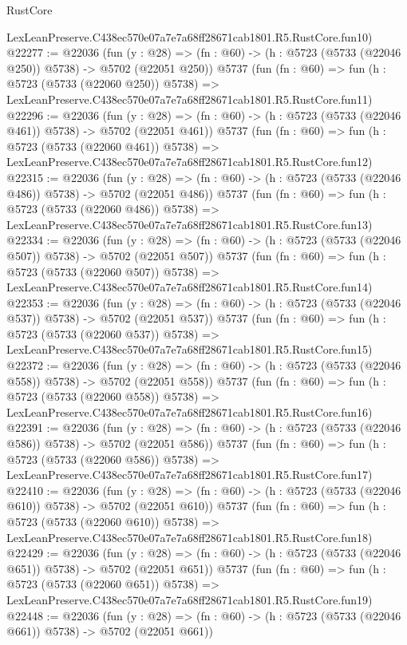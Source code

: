 \begin{lexlean}{RustCore}
\begin{coremodule}
    LexLeanPreserve.C438ec570e07a7e7a68ff28671cab1801.R5.RustCore.fun10)
@22277 := @22036
    (fun (y : @28) => (fn : @60) -> (h : @5723 (@5733 (@22046 @250)) @5738) -> @5702 (@22051 @250))
    @5737
    (fun (fn : @60) =>
    fun (h : @5723 (@5733 (@22060 @250)) @5738) =>
    LexLeanPreserve.C438ec570e07a7e7a68ff28671cab1801.R5.RustCore.fun11)
@22296 := @22036
    (fun (y : @28) => (fn : @60) -> (h : @5723 (@5733 (@22046 @461)) @5738) -> @5702 (@22051 @461))
    @5737
    (fun (fn : @60) =>
    fun (h : @5723 (@5733 (@22060 @461)) @5738) =>
    LexLeanPreserve.C438ec570e07a7e7a68ff28671cab1801.R5.RustCore.fun12)
@22315 := @22036
    (fun (y : @28) => (fn : @60) -> (h : @5723 (@5733 (@22046 @486)) @5738) -> @5702 (@22051 @486))
    @5737
    (fun (fn : @60) =>
    fun (h : @5723 (@5733 (@22060 @486)) @5738) =>
    LexLeanPreserve.C438ec570e07a7e7a68ff28671cab1801.R5.RustCore.fun13)
@22334 := @22036
    (fun (y : @28) => (fn : @60) -> (h : @5723 (@5733 (@22046 @507)) @5738) -> @5702 (@22051 @507))
    @5737
    (fun (fn : @60) =>
    fun (h : @5723 (@5733 (@22060 @507)) @5738) =>
    LexLeanPreserve.C438ec570e07a7e7a68ff28671cab1801.R5.RustCore.fun14)
@22353 := @22036
    (fun (y : @28) => (fn : @60) -> (h : @5723 (@5733 (@22046 @537)) @5738) -> @5702 (@22051 @537))
    @5737
    (fun (fn : @60) =>
    fun (h : @5723 (@5733 (@22060 @537)) @5738) =>
    LexLeanPreserve.C438ec570e07a7e7a68ff28671cab1801.R5.RustCore.fun15)
@22372 := @22036
    (fun (y : @28) => (fn : @60) -> (h : @5723 (@5733 (@22046 @558)) @5738) -> @5702 (@22051 @558))
    @5737
    (fun (fn : @60) =>
    fun (h : @5723 (@5733 (@22060 @558)) @5738) =>
    LexLeanPreserve.C438ec570e07a7e7a68ff28671cab1801.R5.RustCore.fun16)
@22391 := @22036
    (fun (y : @28) => (fn : @60) -> (h : @5723 (@5733 (@22046 @586)) @5738) -> @5702 (@22051 @586))
    @5737
    (fun (fn : @60) =>
    fun (h : @5723 (@5733 (@22060 @586)) @5738) =>
    LexLeanPreserve.C438ec570e07a7e7a68ff28671cab1801.R5.RustCore.fun17)
@22410 := @22036
    (fun (y : @28) => (fn : @60) -> (h : @5723 (@5733 (@22046 @610)) @5738) -> @5702 (@22051 @610))
    @5737
    (fun (fn : @60) =>
    fun (h : @5723 (@5733 (@22060 @610)) @5738) =>
    LexLeanPreserve.C438ec570e07a7e7a68ff28671cab1801.R5.RustCore.fun18)
@22429 := @22036
    (fun (y : @28) => (fn : @60) -> (h : @5723 (@5733 (@22046 @651)) @5738) -> @5702 (@22051 @651))
    @5737
    (fun (fn : @60) =>
    fun (h : @5723 (@5733 (@22060 @651)) @5738) =>
    LexLeanPreserve.C438ec570e07a7e7a68ff28671cab1801.R5.RustCore.fun19)
@22448 := @22036
    (fun (y : @28) => (fn : @60) -> (h : @5723 (@5733 (@22046 @661)) @5738) -> @5702 (@22051 @661))

\end{coremodule}
\end{lexlean}
